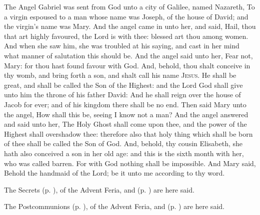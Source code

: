  The Angel Gabriel was sent from God unto a city of Galilee, named Nazareth, To a virgin espoused to a man whose name was Joseph, of the house of David; and the virgin's name was Mary. And the angel came in unto her, and said, Hail, thou that art highly favoured, the Lord is with thee: blessed art thou among women. And when she saw him, she was troubled at his saying, and cast in her mind what manner of salutation this should be. And the angel said unto her, Fear not, Mary: for thou hast found favour with God. And, behold, thou shalt conceive in thy womb, and bring forth a son, and shalt call his name {\textsc{Jesus}}. He shall be great, and shall be called the Son of the Highest: and the Lord God shall give unto him the throne of his father David: And he shall reign over the house of Jacob for ever; and of his kingdom there shall be no end. Then said Mary unto the angel, How shall this be, seeing I know not a man? And the angel answered and said unto her, The Holy Ghost shall come upon thee, and the power of the Highest shall overshadow thee: therefore also that holy thing which shall be born of thee shall be called the Son of God. And, behold, thy cousin Elisabeth, she hath also conceived a son in her old age: and this is the sixth month with her, who was called barren. For with God nothing shall be impossible. And Mary said, Behold the handmaid of the Lord; be it unto me according to thy word.
\begin{rubric}
    The Secrets  (p. \pageref{SPMaryInAdvent}), of the Advent Feria, and  (p. \pageref{SPHolyGhost}) are here said.
\end{rubric}


\begin{rubric}
    The Postcommunions  (p. \pageref{SPMaryInAdvent}), of the Advent Feria, and  (p. \pageref{SPHolyGhost}) are here said.
\end{rubric}

